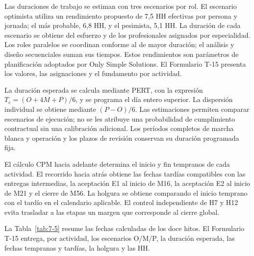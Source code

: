 \documentclass[11pt]{article}
\begin{document}
Las duraciones de trabajo se estiman con tres escenarios por rol. El escenario optimista utiliza un rendimiento propuesto de 7,5 HH efectivas por persona y jornada; el más probable, 6,8 HH, y el pesimista, 5,1 HH. La duración de cada escenario se obtiene del esfuerzo y de los profesionales asignados por especialidad. Los roles paralelos se coordinan conforme al de mayor duración; el análisis y diseño secuenciales suman sus tiempos. Estos rendimientos son parámetros de planificación adoptados por Only Simple Solutions. El Formulario T-15 presenta los valores, las asignaciones y el fundamento por actividad.

La duración esperada se calcula mediante PERT, con la expresión $T_e=(O+4M+P)/6$, y se programa el día entero superior. La dispersión individual se obtiene mediante $(P-O)/6$. Las estimaciones permiten comparar escenarios de ejecución; no se les atribuye una probabilidad de cumplimiento contractual sin una calibración adicional. Los períodos completos de marcha blanca y operación y los plazos de revisión conservan su duración programada fija.

El cálculo CPM hacia adelante determina el inicio y fin tempranos de cada actividad. El recorrido hacia atrás obtiene las fechas tardías compatibles con las entregas intermedias, la aceptación E1 al inicio de M16, la aceptación E2 al inicio de M21 y el cierre de M56. La holgura se obtiene comparando el inicio temprano con el tardío en el calendario aplicable. El control independiente de H7 y H12 evita trasladar a las etapas un margen que corresponde al cierre global.

La Tabla~\ref{tab:7-5} resume las fechas calculadas de los doce hitos. El Formulario T-15 entrega, por actividad, los escenarios O/M/P, la duración esperada, las fechas tempranas y tardías, la holgura y las HH.
\end{document}
